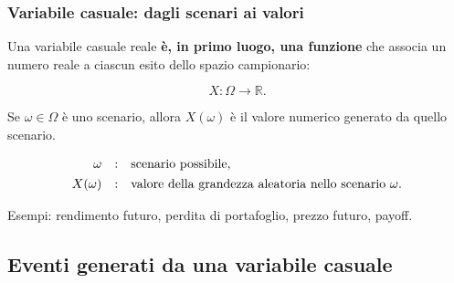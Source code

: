 \documentclass[handout]{beamer}%
\providecommand{\1}{\mathbf{1}}
\providecommand{\QTR}[2]{\csname #1\endcsname{#2}}
\begin{document}
\begin{frame}%
%

\frametitle{Variabile casuale: dagli scenari ai valori}%


Una variabile casuale reale \textbf{\`{e}, in primo luogo, una funzione} che
associa un numero reale a ciascun esito dello spazio campionario:%

\[
X:\Omega\longrightarrow\mathbb{R}.
\]


\medskip

Se $\omega\in\Omega$ \`{e} uno scenario, allora $X(\omega)$ \`{e} il valore
numerico generato da quello scenario.

\medskip%

\[%
\begin{array}
[c]{rcl}%
\omega & : & \mbox{scenario possibile},\\[4pt]%
X(\omega) & : & \mbox{valore della grandezza aleatoria nello scenario }
\omega.
\end{array}
\]


\medskip

Esempi: rendimento futuro, perdita di portafoglio, prezzo futuro, payoff.%

\transboxout
\end{frame}%




\subsection{Eventi generati da una variabile casuale}%
\end{document}
